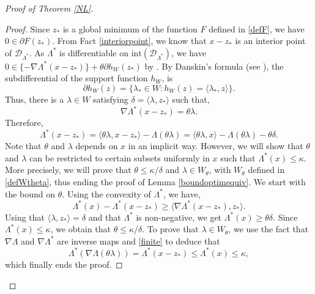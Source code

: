 \documentclass[aop,preprint]{imsart}
\numberwithin{equation}{section}
\theoremstyle{definition}
\theoremstyle{plain}
\theoremstyle{remark}
\begin{document}
\begin{proof}[Proof of Theorem \ref{NL}]
\begin{proof}
Since $z_*$ is a global minimum of the function $F$ defined in \eqref{defF}, we have $0 \in \partial F(z_*)$. 
From Fact \ref{interiorpoint}, we know that $x-z_*$ is an interior point of $\mathcal{D}_{\Lambda^*}$. As $\Lambda^*$ is differentiable on $\mathrm{int}(\mathcal{D}_{\Lambda^*})$, we have $0 \in \{- \nabla \Lambda^*(x-z_*)\} + \theta\partial h_W(z_*)$ by \cite[Theorem 4.10]{Clarke}.  By Danskin's formula (see \cite[Theorem 10.22]{Clarke}), the subdifferential of the support function $h_W$, is
$$\partial h_W(z) =\{ \lambda_* \in W: h_W(z) = \langle \lambda_*, z\rangle\}.$$
Thus, there is a $\lambda \in W$ satisfying $\delta = \langle\lambda , z_*\rangle$ such that,
\begin{equation} \label{crit} \nabla \Lambda^*(x-z_*) = \theta \lambda.\end{equation}
Therefore,
$$\Lambda^*(x-z_*) = \langle \theta \lambda, x-z_*\rangle - \Lambda (\theta\lambda) =  \langle \theta \lambda, x\rangle - \Lambda (\theta\lambda)-\theta \delta.$$
Note that $\theta$ and $\lambda$ depends on $x$ in an implicit way. However, we will show that $\theta$ and $\lambda$ can be restricted to certain subsets uniformly in $x$ such that $\Lambda^*(x) \leq \kappa$. More precisely, we will prove that $\theta \leq \kappa/\delta$ and $\lambda \in W_\theta$, with $W_\theta$ defined in \eqref{defWtheta}, thus ending the proof of  Lemma \ref{boundoptimequiv}.
We start with the bound on $\theta$. Using the convexity of $\Lambda^*$, we have,
$$\Lambda^*(x) -\Lambda^*(x-z_*) \geq \langle \nabla \Lambda^*(x-z_*), z_*\rangle.$$ Using that  $\langle \lambda, z_* \rangle = \delta$ and that $\Lambda^*$ is non-negative, we get $\Lambda^*(x) \geq \theta \delta$. Since $\Lambda^*(x)\leq \kappa$, we obtain that $\theta \leq \kappa/\delta$. To prove that $\lambda \in W_\theta$, we use the fact that $\nabla \Lambda$ and $\nabla \Lambda^*$ are inverse maps and \eqref{finite} to deduce that 
 $$\Lambda^*( \nabla \Lambda(\theta \lambda)) =  \Lambda^*(x-z_*)\leq \Lambda^*(x)\leq \kappa,$$
which finally ends the proof.









\end{proof}
\end{proof}
\end{document}
